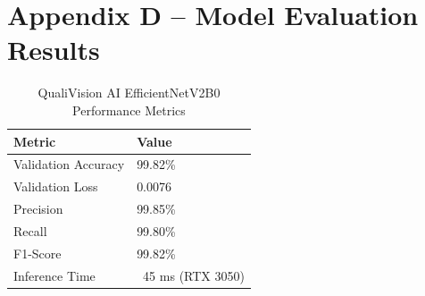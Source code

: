 \section*{Appendix D – Model Evaluation Results}
\begin{table}[H]
\centering
\begin{tabular}{|l|l|}
\hline
\textbf{Metric} & \textbf{Value} \\
\hline
Validation Accuracy & 99.82\% \\
\hline
Validation Loss & 0.0076 \\
\hline
Precision & 99.85\% \\
\hline
Recall & 99.80\% \\
\hline
F1-Score & 99.82\% \\
\hline
Inference Time & ~45 ms (RTX 3050) \\
\hline
\end{tabular}
\caption{QualiVision AI EfficientNetV2B0 Performance Metrics}
\end{table}
